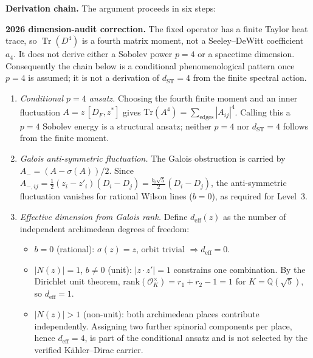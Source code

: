 \documentclass[12pt,a4paper]{article}
\theoremstyle{definition}
\begin{document}
\textbf{Derivation chain.}  The argument proceeds in six steps:

\noindent\textbf{2026 dimension-audit correction.}  The fixed operator has a
finite Taylor heat trace, so $\operatorname{Tr}(D^4)$ is a fourth matrix moment,
not a Seeley--DeWitt coefficient $a_4$.  It does not derive either a Sobolev
power $p=4$ or a spacetime dimension.  Consequently the chain below is a
conditional phenomenological pattern once $p=4$ is assumed; it is not a
derivation of $d_{\mathrm{ST}}=4$ from the finite spectral action.

\begin{enumerate}
\item[(A)] \emph{Conditional $p=4$ ansatz.}  Choosing the fourth finite moment and an inner fluctuation $A = z\,[D_F, z^*]$ gives $\mathrm{Tr}(A^4) = \sum_{\text{edges}} |A_{ij}|^4$.  Calling this a $p=4$ Sobolev energy is a structural ansatz; neither $p=4$ nor $d_{\mathrm{ST}}=4$ follows from the finite moment.

\item[(B)] \emph{Galois anti-symmetric fluctuation.}  The Galois obstruction is carried by $A_- = (A - \sigma(A))/2$.  Since $A_{-,ij} = \tfrac{1}{2}(z_i - z'_i)(D_i - D_j) = \tfrac{b_i\sqrt{5}}{2}(D_i - D_j)$, the anti-symmetric fluctuation vanishes for rational Wilson lines ($b = 0$), as required for Level~3.

\item[(C)] \emph{Effective dimension from Galois rank.}  Define $d_{\text{eff}}(z)$ as the number of independent archimedean degrees of freedom:
\begin{itemize}
\item $b = 0$ (rational): $\sigma(z) = z$, orbit trivial $\Rightarrow d_{\text{eff}} = 0$.
\item $|N(z)| = 1$, $b \neq 0$ (unit): $|z \cdot z'| = 1$ constrains one combination.  By the Dirichlet unit theorem, $\mathrm{rank}(\mathcal{O}_K^\times) = r_1 + r_2 - 1 = 1$ for $K = \mathbb{Q}(\sqrt{5})$, so $d_{\text{eff}} = 1$.
\item $|N(z)| > 1$ (non-unit): both archimedean places contribute independently.  Assigning two further spinorial components per place, hence $d_{\text{eff}}=4$, is part of the conditional ansatz and is not selected by the verified K\"ahler--Dirac carrier.
\end{itemize}


\end{enumerate}
\end{document}
